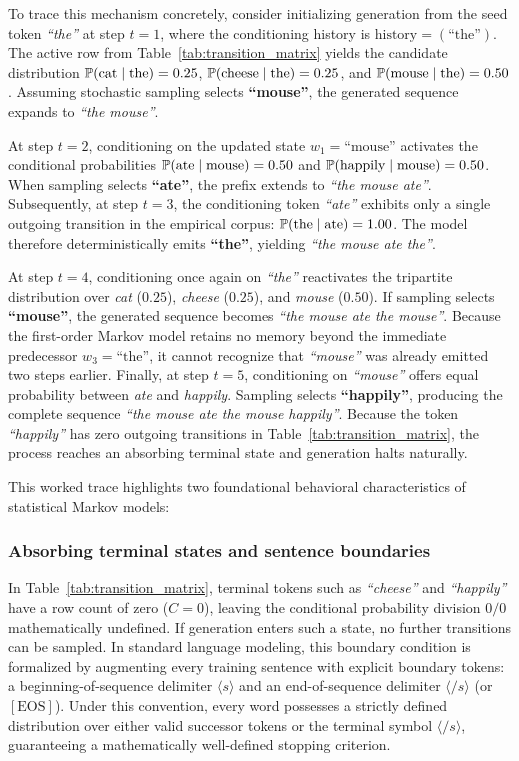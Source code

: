\documentclass[../../main.tex]{subfiles}
\begin{document}
To trace this mechanism concretely, consider initializing generation from the seed token \textit{``the''} at step $t=1$, where the conditioning history is $\text{history} = (\text{``the''})$. The active row from Table~\ref{tab:transition_matrix} yields the candidate distribution $\mathbb{P}(\text{cat}\mid\text{the}) = 0.25$, $\mathbb{P}(\text{cheese}\mid\text{the}) = 0.25$, and $\mathbb{P}(\text{mouse}\mid\text{the}) = 0.50$. Assuming stochastic sampling selects \textbf{``mouse''}, the generated sequence expands to \textit{``the mouse''}.

At step $t=2$, conditioning on the updated state $w_1 = \text{``mouse''}$ activates the conditional probabilities $\mathbb{P}(\text{ate}\mid\text{mouse}) = 0.50$ and $\mathbb{P}(\text{happily}\mid\text{mouse}) = 0.50$. When sampling selects \textbf{``ate''}, the prefix extends to \textit{``the mouse ate''}. Subsequently, at step $t=3$, the conditioning token \textit{``ate''} exhibits only a single outgoing transition in the empirical corpus: $\mathbb{P}(\text{the}\mid\text{ate}) = 1.00$. The model therefore deterministically emits \textbf{``the''}, yielding \textit{``the mouse ate the''}.

At step $t=4$, conditioning once again on \textit{``the''} reactivates the tripartite distribution over \textit{cat} ($0.25$), \textit{cheese} ($0.25$), and \textit{mouse} ($0.50$). If sampling selects \textbf{``mouse''}, the generated sequence becomes \textit{``the mouse ate the mouse''}. Because the first-order Markov model retains no memory beyond the immediate predecessor $w_3 = \text{``the''}$, it cannot recognize that \textit{``mouse''} was already emitted two steps earlier. Finally, at step $t=5$, conditioning on \textit{``mouse''} offers equal probability between \textit{ate} and \textit{happily}. Sampling selects \textbf{``happily''}, producing the complete sequence \textit{``the mouse ate the mouse happily''}. Because the token \textit{``happily''} has zero outgoing transitions in Table~\ref{tab:transition_matrix}, the process reaches an absorbing terminal state and generation halts naturally.

This worked trace highlights two foundational behavioral characteristics of statistical Markov models:

\subsubsection{Absorbing terminal states and sentence boundaries}
In Table~\ref{tab:transition_matrix}, terminal tokens such as \textit{``cheese''} and \textit{``happily''} have a row count of zero ($C=0$), leaving the conditional probability division $0/0$ mathematically undefined. If generation enters such a state, no further transitions can be sampled. In standard language modeling, this boundary condition is formalized by augmenting every training sentence with explicit boundary tokens: a beginning-of-sequence delimiter $\langle s \rangle$ and an end-of-sequence delimiter $\langle /s \rangle$ (or $[\text{EOS}]$). Under this convention, every word possesses a strictly defined distribution over either valid successor tokens or the terminal symbol $\langle /s \rangle$, guaranteeing a mathematically well-defined stopping criterion.
\end{document}

